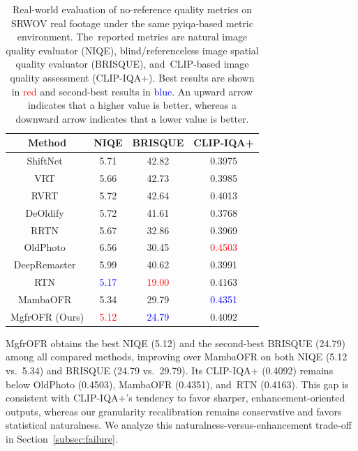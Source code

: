 \documentclass[symmetry,article,accept,pdftex,moreauthors]{Definitions/mdpi}
\DeclareRobustCommand{\bestres}[1]{\textcolor{red}{#1}}
\DeclareRobustCommand{\secondres}[1]{\textcolor{blue}{#1}}
\begin{document}
\begin{table}[H]
\caption{Real-world evaluation of no-reference quality metrics on SRWOV real footage under the same pyiqa-based metric environment. The~reported metrics are natural image quality evaluator (NIQE), blind/referenceless image spatial quality evaluator (BRISQUE), and~CLIP-based image quality assessment (CLIP-IQA+). Best results are shown in \bestres{red} and second-best results in \secondres{blue}. An upward arrow indicates that a higher value is better, whereas a downward arrow indicates that a lower value is better.\label{tab:realworld}}
\begin{tabularx}{\textwidth}{cCCC}
\toprule
\textbf{Method} & \textbf{NIQE \boldmath{$\downarrow$}} & \textbf{BRISQUE \boldmath{$\downarrow$}} & \textbf{CLIP-IQA+ \boldmath{$\uparrow$}} \\
\midrule
ShiftNet~\cite{li2023shiftnet}             & 5.71  & 42.82 & 0.3975 \\
VRT~\cite{liang2024vrt}                    & 5.66  & 42.73 & 0.3985 \\
RVRT~\cite{liang2022rvrt}                 & 5.72  & 42.64 & 0.4013 \\
DeOldify~\cite{jantic2019deoldify}         & 5.72  & 41.61 & 0.3768 \\
RRTN~\cite{lin2024rrtn}                   & 5.67  & 32.86 & 0.3969 \\
OldPhoto~\cite{wan2023oldphotopami}        & 6.56  & 30.45 & \bestres{0.4503} \\
DeepRemaster~\cite{iizuka2019deepremaster} & 5.99  & 40.62 & 0.3991 \\
RTN~\cite{wan2022rtn}                      & \secondres{5.17}  & \bestres{19.00} & 0.4163 \\
MambaOFR~\cite{mao2025mambaofr}           & 5.34  & 29.79 & \secondres{0.4351} \\
\midrule
MgfrOFR (Ours)                             & \bestres{5.12}  & \secondres{24.79} & 0.4092 \\
\bottomrule
\end{tabularx}
\end{table}

MgfrOFR obtains the best NIQE (5.12) and the second-best BRISQUE (24.79) among all compared methods, improving over MambaOFR on both NIQE (5.12 vs.\ 5.34) and BRISQUE (24.79 vs.\ 29.79). Its CLIP-IQA+ (0.4092) remains below OldPhoto (0.4503), MambaOFR (0.4351), and~RTN (0.4163). This gap is consistent with CLIP-IQA+'s tendency to favor sharper, enhancement-oriented outputs, whereas our granularity recalibration remains conservative and favors statistical naturalness. We analyze this naturalness-versus-enhancement trade-off in Section~\ref{subsec:failure}.
\end{document}
